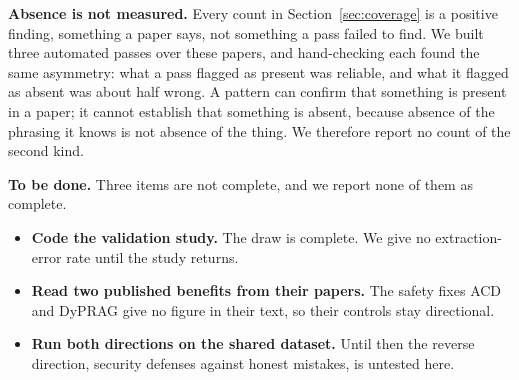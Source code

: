 \textbf{Absence is not measured.} Every count in Section~\ref{sec:coverage}
is a positive finding, something a paper says, not something a pass failed to
find. We built three automated passes over these papers, and hand-checking
each found the same asymmetry: what a pass flagged as present was reliable,
and what it flagged as absent was about half wrong. A pattern can confirm
that something is present in a paper; it cannot establish that something is
absent, because absence of the phrasing it knows is not absence of the thing.
We therefore report no count of the second kind.

\textbf{To be done.} Three items are not complete, and we report none of them
as complete.

\begin{itemize}
\item \textbf{Code the validation study.} The draw is complete. We give no
  extraction-error rate until the study returns.
\item \textbf{Read two published benefits from their papers.} The safety
  fixes ACD and DyPRAG give no figure in their text, so their controls stay
  directional.
\item \textbf{Run both directions on the shared dataset.}
  Until then the reverse direction, security defenses against honest
  mistakes, is untested here.
\end{itemize}
